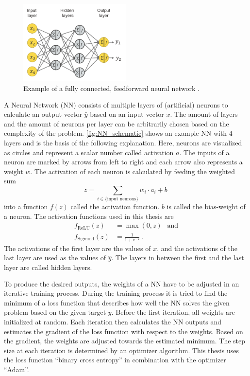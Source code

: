 \begin{figure}
    \centering
    \includegraphics[width=0.5\textwidth]{images/NN_schematic.png}
    \caption{Example of a fully connected, feedforward neural network \cite{NN_schematic}.}
    \label{fig:NN_schematic}
\end{figure}

A Neural Network (NN) consists of multiple layers of (artificial) neurons to calculate an output vector $\hat{y}$ based on an input vector $x$.
The amount of layers and the amount of neurons per layer can be arbitrarily chosen based on the complexity of the problem.
\autoref{fig:NN_schematic} shows an example NN with 4 layers and is the basis of the following explanation.
Here, neurons are visualized as circles and represent a scalar number called activation $a$. 
The inputs of a neuron are marked by arrows from left to right and each arrow also represents a weight $w$.
The activation of each neuron is calculated by feeding the weighted sum 
\begin{equation*}
    z = \sum_{i \in \{\text{input neurons}\}} w_i \cdot a_i + b \, 
\end{equation*}
into a function $f(z)$ called the activation function.
$b$ is called the bias-weight of a neuron.
The activation functions used in this thesis are 
\begin{align*}
    f_\text{ReLU}(z) &= \max(0, z) \:\:\text{  and} \\
    f_\text{Sigmoid}(z) &= \frac{1}{1+e^{-z}} \, .
\end{align*}
The activations of the first layer are the values of $x$, and the activations of the last layer are used as the values of $\hat{y}$.
The layers in between the first and the last layer are called hidden layers.

To produce the desired outputs, the weights of a NN have to be adjusted in an iterative training process.
During the training process it is tried to find the minimum of a loss function that describes how well the NN solves the given problem based on the given target $y$.
Before the first iteration, all weights are initialized at random.
Each iteration then calculates the NN outputs and estimates the gradient of the loss function with respect to the weights.
Based on the gradient, the weights are adjusted towards the estimated minimum.
The step size at each iteration is determined by an optimizer algorithm.
This thesis uses the loss function \enquote{binary cross entropy} in combination with the optimizer \enquote{Adam}\cite{adam}.

